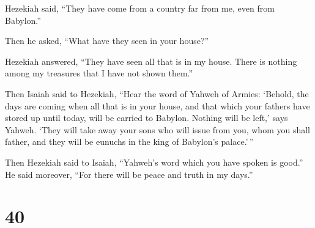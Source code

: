 Hezekiah said, ``They have come from a country far from me, even from
Babylon.''

 Then he asked, ``What have they seen in your house?''

Hezekiah answered, ``They have seen all that is in my house. There is
nothing among my treasures that I have not shown them.''

 Then Isaiah said to Hezekiah, ``Hear the word of Yahweh
of Armies:  `Behold, the days are coming when all that is
in your house, and that which your fathers have stored up until today,
will be carried to Babylon. Nothing will be left,' says Yahweh.
 `They will take away your sons who will issue from you,
whom you shall father, and they will be eunuchs in the king of Babylon's
palace.'\,''

 Then Hezekiah said to Isaiah, ``Yahweh's word which you
have spoken is good.'' He said moreover, ``For there will be peace and
truth in my days.''

\hypertarget{section-39}{%
\section{40}\label{section-39}}

